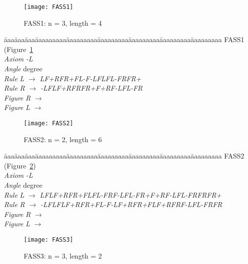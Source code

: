 \begin{figure}[!htbp]
\centerline{\texttt{[image: FASS1]}}
\caption{FASS1: n = 3, length = 4}
\label{fig:Fass1}
\end{figure}


\begin{tabbing}
\=aaa\=aaa\=aaa\=aaaaaaaaa\=aaaaaaaaa\=aaaaaaaaa\=aaaaaaaaa\=aaaaaaaaa\=aaaaaaaaa\kill
FASS1 (Figure~\ref{fig:Fass1}\\
\>\>\>\> \emph{Axiom} \>\>\emph{-L}\\
\>\>\>\> \emph{Angle} \> degree\\
\>\>\>\> \emph{Rule}  \>\>\emph{L $\rightarrow$ LF+RFR+FL-F-LFLFL-FRFR+}\\
\>\>\>\> \emph{Rule}  \>\>\emph{R $\rightarrow$ -LFLF+RFRFR+F+RF-LFL-FR}\\
\>\>\>\> \emph{Figure}  \>\>\emph{R $\rightarrow$ }\\
\>\>\>\> \emph{Figure}  \>\>\emph{L $\rightarrow$ }
\end{tabbing}

\begin{figure}[!htbp]
\centerline{\texttt{[image: FASS2]}}
\caption{FASS2: n = 2, length = 6}
\label{fig:Fass2}
\end{figure}



\begin{tabbing}
\=aaa\=aaa\=aaa\=aaaaaaaaa\=aaaaaaaaa\=aaaaaaaaa\=aaaaaaaaa\=aaaaaaaaa\=aaaaaaaaa\kill
FASS2 (Figure~\ref{fig:Fass2})\\
\>\>\>\> \emph{Axiom} \>\>\emph{-L}\\
\>\>\>\> \emph{Angle} \> degree\\
\>\>\>\> \emph{Rule}  \>\>\emph{L $\rightarrow$ LFLF+RFR+FLFL-FRF-LFL-FR+F+RF-LFL-FRFRFR+}\\
\>\>\>\> \emph{Rule}  \>\>\emph{R $\rightarrow$ -LFLFLF+RFR+FL-F-LF+RFR+FLF+RFRF-LFL-FRFR}\\
\>\>\>\> \emph{Figure}  \>\>\emph{R $\rightarrow$ }\\
\>\>\>\> \emph{Figure}  \>\>\emph{L $\rightarrow$ }
\end{tabbing}

\begin{figure}[!htbp]
\centerline{\texttt{[image: FASS3]}}
\caption{FASS3: n = 3, length = 2}
\label{fig:Fass3}
\end{figure}

